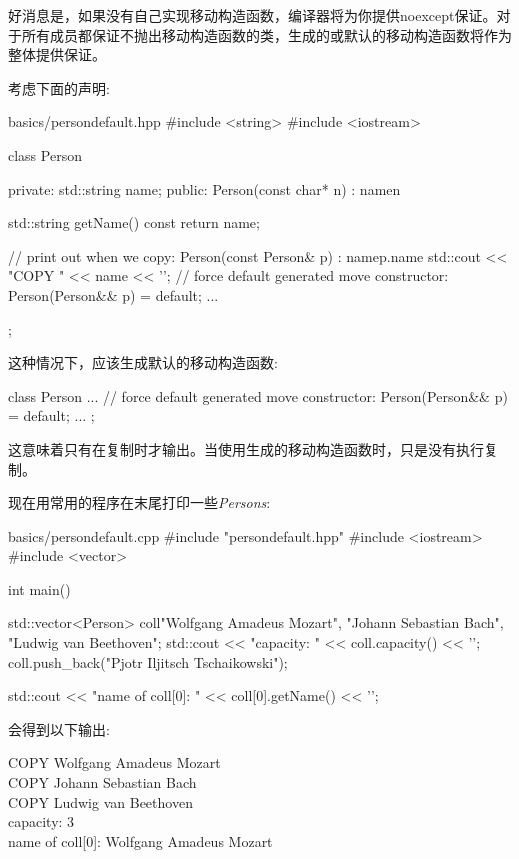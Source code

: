 好消息是，如果没有自己实现移动构造函数，编译器将为你提供noexcept保证。对于所有成员都保证不抛出移动构造函数的类，生成的或默认的移动构造函数将作为整体提供保证。\par

考虑下面的声明:\par

\begin{codeboxt}[cpp]{basics/persondefault.hpp}
#include <string>
#include <iostream>

class Person {
  private:
  std::string name;
  public:
  Person(const char* n)
  : name{n} {
  }

  std::string getName() const {
    return name;
  }

  // print out when we copy:
  Person(const Person& p)
  : name{p.name} {
    std::cout << "COPY " << name << '\n';
  }
  // force default generated move constructor:
  Person(Person&& p) = default;
  ...
};
\end{codeboxt}

这种情况下，应该生成默认的移动构造函数:\par

\begin{codebox}[cpp]
class Person {
  ...
  // force default generated move constructor:
  Person(Person&& p) = default;
  ...
};
\end{codebox}

这意味着只有在复制时才输出。当使用生成的移动构造函数时，只是没有执行复制。\par

现在用常用的程序在末尾打印一些\textit{Persons}:\par

\begin{codeboxt}[cpp]{basics/persondefault.cpp}
#include "persondefault.hpp"
#include <iostream>
#include <vector>

int main()
{
  std::vector<Person> coll{"Wolfgang Amadeus Mozart",
    "Johann Sebastian Bach",
    "Ludwig van Beethoven"};
  std::cout << "capacity: " << coll.capacity() << '\n';
  coll.push_back("Pjotr Iljitsch Tschaikowski");

  std::cout << "name of coll[0]: " << coll[0].getName() << '\n';
}
\end{codeboxt}

会得到以下输出:\par

\begin{myOutput}
COPY Wolfgang Amadeus Mozart \\
COPY Johann Sebastian Bach \\
COPY Ludwig van Beethoven \\
capacity: 3 \\
name of coll[0]: Wolfgang Amadeus Mozart
\end{myOutput}

